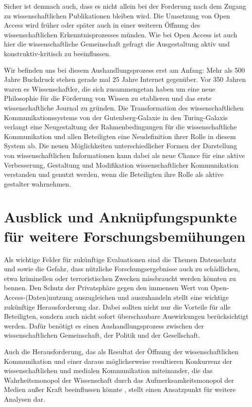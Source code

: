 Sicher ist demnach auch, dass es nicht allein bei der Forderung nach dem Zugang zu wissenschaftlichen Publikationen bleiben wird. Die Umsetzung von Open Access wird früher oder später auch in einer weiteren Öffnung des wissenschaftlichen Erkenntnisprozesses münden. Wie bei Open Access ist auch hier die wissenschaftliche Gemeinschaft gefragt die Ausgestaltung aktiv und konstruktiv-kritisch zu beeinflussen.

Wir befinden uns bei diesem Aushandlungsprozess erst am Anfang: Mehr als 500 Jahre Buchdruck stehen gerade mal 25 Jahre Internet gegenüber. Vor 350 Jahren waren es Wissenschaftler, die sich zusammengetan haben um eine neue Philosophie für die Förderung von Wissen zu etablieren und das erste wissenschaftliche Journal zu gründen. Die Transformation des wissenschaftlichen Kommunikationssystems von der Gutenberg-Galaxie in den Turing-Galaxis verlangt eine Neugestaltung der Rahmenbedingungen für die wissenschaftliche Kommunikation und allen Beteiligten eine Neudefinition ihrer Rolle in diesem System ab. Die neuen Möglichkeiten unterschiedlicher Formen der Darstellung von wissenschaftlichen Informationen kann dabei als neue Chance für eine aktive Verbesserung, Gestaltung und Modifikation wissenschaftlicher Kommunikation verstanden und genutzt werden, wenn die Beteiligten ihre Rolle als aktive gestalter wahrnehmen.

\section{Ausblick und Anknüpfungspunkte für weitere Forschungsbemühungen}

Als wichtige Felder für zukünftige Evaluationen sind die Themen Datenschutz und sowie die Gefahr, dass nützliche Forschungsergebnisse auch zu schädlichen, etwa kriminellen oder terroristischen Zwecken missbraucht werden könnten \cite{Fritsch_2015} zu bennen. Den Schutz der Privatsphäre gegen den immensen Wert von Open-Access-(Daten)nutzung auszugleichen und auszuhandeln stellt eine wichtige zukünftige Herausforderung dar. Dabei sollten nicht nur die Vorteile für alle Beteiligten, sondern auch nicht sofort überschaubare Auswirkungen berücksichtigt werden. Dafür benötigt es einen Aushandlungsprozess zwischen der wissenschaftlichen Gemeinschaft, der Politik und der Gesellschaft.

Auch die Herausforderung, das als Resultat der Öffnung der wissenschaftlichen Kommunikation und einer daraus möglicherweise resultieren Konkurrenz der wissenschaftlichen und medialen Kommunikation miteinander, die das Wahrheitsmonopol der Wissenschaft durch das Aufmerksamkeitsmonopol der Medien außer Kraft beeinflussen könnte \cite{weingart_2005_wissenschaft}, stellt einen Ansatzpunkt für weitere Analysen dar.

